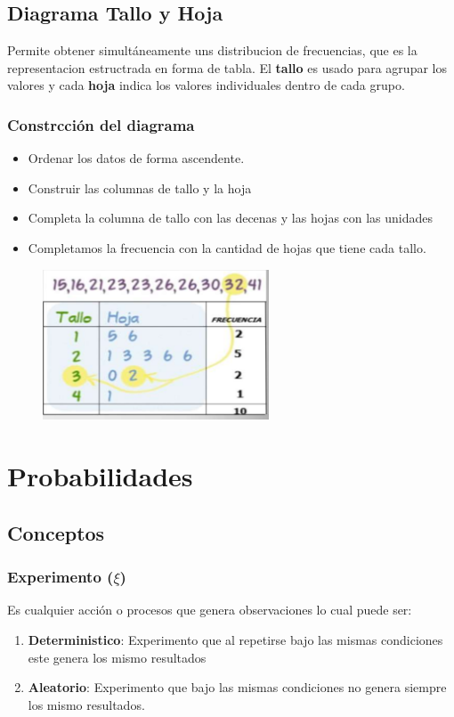 \documentclass{article}
\begin{document}
    \subsection{Diagrama Tallo y Hoja}
        Permite obtener simultáneamente uns distribucion de frecuencias, que es la representacion estructrada en forma de tabla. El \textbf{tallo} es usado para agrupar los valores y cada \textbf{hoja} indica los valores individuales dentro de cada grupo.
        \subsubsection{Constrcción del diagrama}
            \begin{itemize}
                \item Ordenar los datos de forma ascendente.
                \item Construir las columnas de tallo y la hoja
                \item Completa la columna de tallo con las decenas y las hojas con las unidades
                \item Completamos la frecuencia con la cantidad de hojas que tiene cada tallo.
            \end{itemize}
            \begin{figure}[H]
                \centering
                \includegraphics[width=0.6\textwidth]{img/tallo.png}
            \end{figure}

\section{Probabilidades}
    \subsection{Conceptos}
        \subsubsection{\texorpdfstring{Experimento ($\xi$)}{Experimento (xi)}}
            Es cualquier acción o procesos que genera observaciones lo cual puede ser:
            \begin{enumerate}
                \item\textbf{Deterministico}: Experimento que al repetirse bajo las mismas condiciones este genera los mismo resultados
                \item \textbf{Aleatorio}: Experimento que bajo las mismas condiciones no genera siempre los mismo resultados.
            \end{enumerate}
\end{document}
